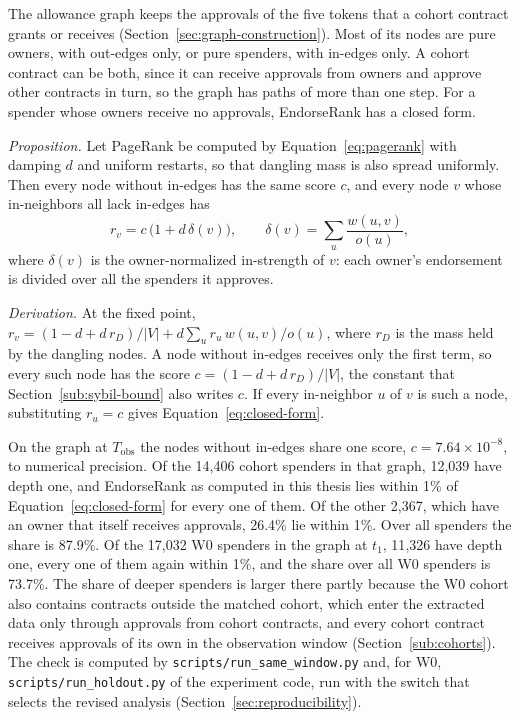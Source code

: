 
The allowance graph keeps the approvals of the five tokens that a cohort contract grants or receives (Section~\ref{sec:graph-construction}). Most of its nodes are pure owners, with out-edges only, or pure spenders, with in-edges only. A cohort contract can be both, since it can receive approvals from owners and approve other contracts in turn, so the graph has paths of more than one step. For a spender whose owners receive no approvals, EndorseRank has a closed form.

\emph{Proposition.} Let PageRank be computed by Equation~\eqref{eq:pagerank} with damping $d$ and uniform restarts, so that dangling mass is also spread uniformly. Then every node without in-edges has the same score $c$, and every node $v$ whose in-neighbors all lack in-edges has
\begin{equation}
\label{eq:closed-form}
r_v = c\,\bigl(1 + d\,\delta(v)\bigr), \qquad \delta(v)=\sum_{u} \frac{w(u,v)}{o(u)},
\end{equation}
where $\delta(v)$ is the owner-normalized in-strength of $v$: each owner's endorsement is divided over all the spenders it approves.

\emph{Derivation.} At the fixed point, $r_v = (1-d+d\,r_D)/|V| + d\sum_u r_u\,w(u,v)/o(u)$, where $r_D$ is the mass held by the dangling nodes. A node without in-edges receives only the first term, so every such node has the score $c=(1-d+d\,r_D)/|V|$, the constant that Section~\ref{sub:sybil-bound} also writes $c$. If every in-neighbor $u$ of $v$ is such a node, substituting $r_u=c$ gives Equation~\eqref{eq:closed-form}.

On the graph at $T_{\mathrm{obs}}$ the nodes without in-edges share one score, $c=7.64\times10^{-8}$, to numerical precision. Of the 14{,}406 cohort spenders in that graph, 12{,}039 have depth one, and EndorseRank as computed in this thesis lies within 1\% of Equation~\eqref{eq:closed-form} for every one of them. Of the other 2{,}367, which have an owner that itself receives approvals, 26.4\% lie within 1\%. Over all spenders the share is 87.9\%. Of the 17{,}032 W0 spenders in the graph at $t_1$, 11{,}326 have depth one, every one of them again within 1\%, and the share over all W0 spenders is 73.7\%. The share of deeper spenders is larger there partly because the W0 cohort also contains contracts outside the matched cohort, which enter the extracted data only through approvals from cohort contracts, and every cohort contract receives approvals of its own in the observation window (Section~\ref{sub:cohorts}). The check is computed by \texttt{scripts/run\_same\_window.py} and, for W0, \texttt{scripts/run\_holdout.py} of the experiment code, run with the switch that selects the revised analysis (Section~\ref{sec:reproducibility}).

